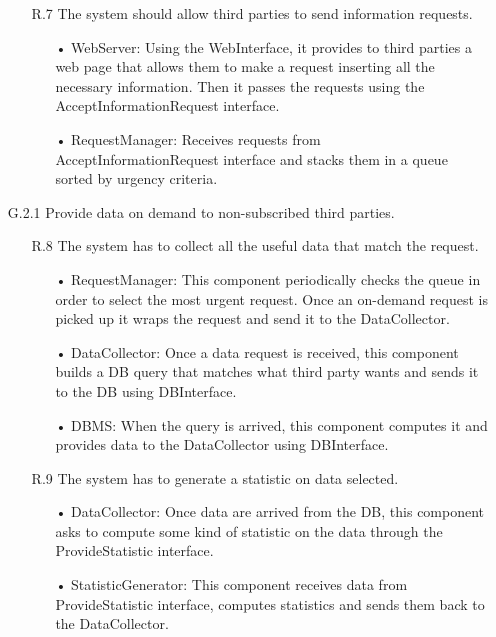 \begin{enumerate}
\begin{enumerate}
	\item [R.7] The system should allow third parties to send information requests.
		\begin{enumerate}
		\item[•] WebServer: Using the WebInterface, it provides to third parties a web page that allows them to make a request inserting all the necessary information. Then it passes the requests using the AcceptInformationRequest interface.
		\item[•] RequestManager: Receives requests from AcceptInformationRequest interface and stacks them in a queue sorted by urgency criteria.
		\end{enumerate}	
	\end{enumerate}

\item [G.2.1] Provide data on demand to non-subscribed third parties.
	\begin{enumerate}
	\item [R.8] The system has to collect all the useful data that match the request.
		\begin{enumerate}
		\item[•] RequestManager: This component periodically checks the queue in order to select the most urgent request. Once an on-demand request is picked up it wraps the request and send it to the DataCollector.
		\item[•] DataCollector: Once a data request is received, this component builds a DB query that matches what third party wants and sends it to the DB using DBInterface.
		\item[•] DBMS: When the query is arrived, this component computes it and provides data to the DataCollector using DBInterface.
		\end{enumerate}	
			
	\item [R.9 ] The system has to generate a statistic on data selected.
		\begin{enumerate}
		\item[•] DataCollector: Once data are arrived from the DB, this component asks to compute some kind of statistic on the data through the ProvideStatistic interface.
		\item[•] StatisticGenerator: This component receives data from ProvideStatistic interface, computes statistics and sends them back to the DataCollector.
		\end{enumerate}	
		

\end{enumerate}
\end{enumerate}
